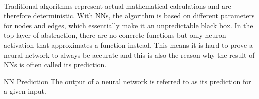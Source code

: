 \\
Traditional algorithms represent actual mathematical calculations and are therefore deterministic.
With NNs, the algorithm is based on different parameters for nodes and edges, which essentially make it an unpredictable black box.
In the top layer of abstraction, there are no concrete functions but only neuron activation that approximates a function instead.
This means it is hard to prove a neural network to always be accurate and this is also the reason why the result of NNs is often called its prediction. \cite{springer_blackbox}%

\begin{mydef}{NN Prediction}
    The output of a neural network is referred to as its prediction for a given input.\cite{Warudkar2020}
\end{mydef}

